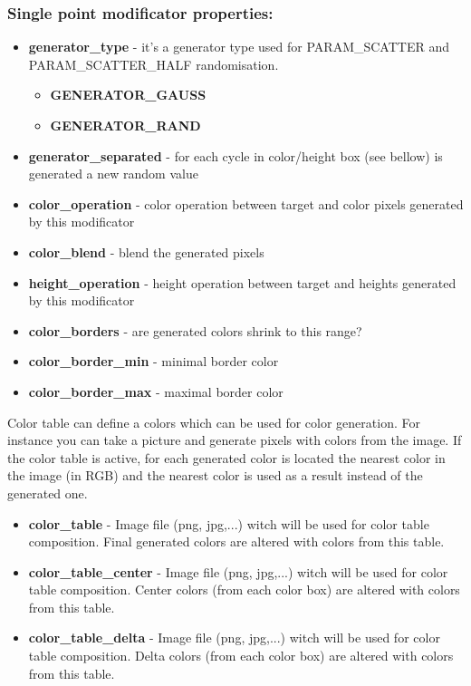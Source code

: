 \documentclass[9pt]{article}
\begin{document}
\subsubsection*{Single point modificator properties:}
\begin{itemize}
\item{\bf generator\_type} - it's a generator type used for PARAM\_SCATTER 
and PARAM\_SCATTER\_HALF randomisation.
\begin{itemize}
\item{\bf GENERATOR\_GAUSS}
\item{\bf GENERATOR\_RAND}
\end{itemize}
\item{\bf generator\_separated} - for each cycle in color/height box (see bellow) is
generated a new random value
\item{\bf color\_operation} - color operation between target and color pixels 
generated by this modificator
\item{\bf color\_blend} - blend the generated pixels
\item{\bf height\_operation} - height operation between target and heights
generated by this modificator
\item{\bf color\_borders} - are generated colors shrink to this range?
\item{\bf color\_border\_min} - minimal border color
\item{\bf color\_border\_max} - maximal border color
\end{itemize}
Color table can define a colors which can be used for color generation. 
For instance you can take a picture and generate pixels with colors from
the image. If the color table is active, for each generated
color is located the nearest color in the image (in RGB) and the nearest 
color is used as a result instead of the generated one.
\begin{itemize}
\item{\bf color\_table} - Image file (png, jpg,...) witch will be used for 
color table composition. Final generated colors are altered with colors from this table.
\item{\bf color\_table\_center} - Image file (png, jpg,...) witch will be used 
for color table composition. Center colors (from each color box) are altered 
with colors from this table.
\item{\bf color\_table\_delta} - Image file (png, jpg,...) witch will be used 
for color table composition. Delta colors (from each color box) are altered 
with colors from this table.
\end{itemize}
\end{document}

